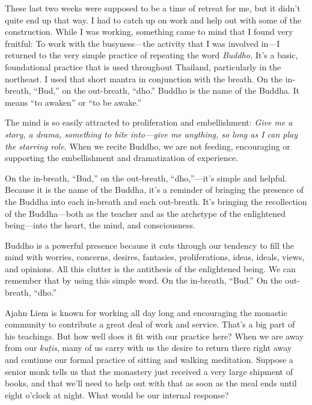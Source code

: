 
These last two weeks were supposed to be a time of retreat for me, but 
it didn't quite end up that way. I had to catch up on work and help out 
with some of the construction. While I was working, something came to 
mind that I found very fruitful: To work with the busyness---the 
activity that I was involved in---I returned to the very simple 
practice of repeating the word \emph{Buddho.} It's a basic, 
foundational practice that is used throughout Thailand, particularly in 
the northeast. I used that short mantra in conjunction with the breath. 
On the in-breath, ``Bud,'' on the out-breath, ``dho.'' Buddho is the 
name of the Buddha. It means ``to awaken'' or ``to be awake.''

The mind is so easily attracted to proliferation and embellishment: 
\emph{Give me a story, a drama, something to bite into---give me 
anything, so long as I can play the starring role.} When we recite 
Buddho, we are not feeding, encouraging or supporting the embellishment 
and dramatization of experience.

On the in-breath, ``Bud,'' on the out-breath, ``dho,''---it's simple 
and helpful. Because it is the name of the Buddha, it's a reminder of 
bringing the presence of the Buddha into each in-breath and each 
out-breath. It's bringing the recollection of the Buddha---both as the 
teacher and as the archetype of the enlightened being---into the heart, 
the mind, and consciousness.

Buddho is a powerful presence because it cuts through our tendency to 
fill the mind with worries, concerns, desires, fantasies, 
proliferations, ideas, ideals, views, and opinions. All this clutter is 
the antithesis of the enlightened being. We can remember that by using 
this simple word. On the in-breath, ``Bud.'' On the out-breath, ``dho.''


Ajahn Liem is known for working all day long and encouraging the 
monastic community to contribute a great deal of work and service. 
That's a big part of his teachings. But how well does it fit with our 
practice here? When we are away from our \emph{kuṭis}, many of us 
carry with us the desire to return there right away and continue our 
formal practice of sitting and walking meditation. Suppose a senior 
monk tells us that the monastery just received a very large shipment of 
books, and that we'll need to help out with that as soon as the meal 
ends until eight o'clock at night. What would be our internal response?

